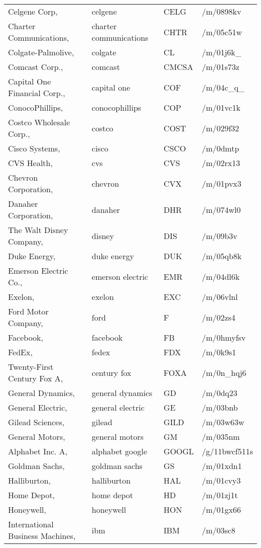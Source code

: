 \begin{longtable}[c]{llll}
Celgene Corp, & celgene & CELG & /m/0898kv \\
Charter Communications, & charter communications & CHTR & /m/05c51w \\
Colgate-Palmolive, & colgate & CL & /m/01j6k\_ \\
Comcast Corp., & comcast & CMCSA & /m/01s73z \\
Capital One Financial Corp., & capital one & COF & /m/04c\_q\_ \\
ConocoPhillips, & conocophillips & COP & /m/01vc1k \\
Costco Wholesale Corp., & costco & COST & /m/029f32 \\
Cisco Systems, & cisco & CSCO & /m/0dmtp \\
CVS Health, & cvs & CVS & /m/02rx13 \\
Chevron Corporation, & chevron & CVX & /m/01pvx3 \\
Danaher Corporation, & danaher & DHR & /m/074wl0 \\
The Walt Disney Company, & disney & DIS & /m/09b3v \\
Duke Energy, & duke energy & DUK & /m/05qb8k \\
Emerson Electric Co., & emerson electric & EMR & /m/04dl6k \\
Exelon, & exelon & EXC & /m/06vlnl \\
Ford Motor Company, & ford & F & /m/02zs4 \\
Facebook, & facebook & FB & /m/0hmyfsv \\
FedEx, & fedex & FDX & /m/0k9s1 \\
Twenty-First Century Fox A, & century fox & FOXA & /m/0n\_hqj6 \\
General Dynamics, & general dynamics & GD & /m/0dq23 \\
General Electric, & general electric & GE & /m/03bnb \\
Gilead Sciences, & gilead & GILD & /m/03w63w \\
General Motors, & general motors & GM & /m/035nm \\
Alphabet Inc. A, & alphabet google & GOOGL & /g/11bwcf511s \\
Goldman Sachs, & goldman sachs & GS & /m/01xdn1 \\
Halliburton, & halliburton & HAL & /m/01cvy3 \\
Home Depot, & home depot & HD & /m/01zj1t \\
Honeywell, & honeywell & HON & /m/01gx66 \\
International Business Machines, & ibm & IBM & /m/03sc8 \\

\end{longtable}
